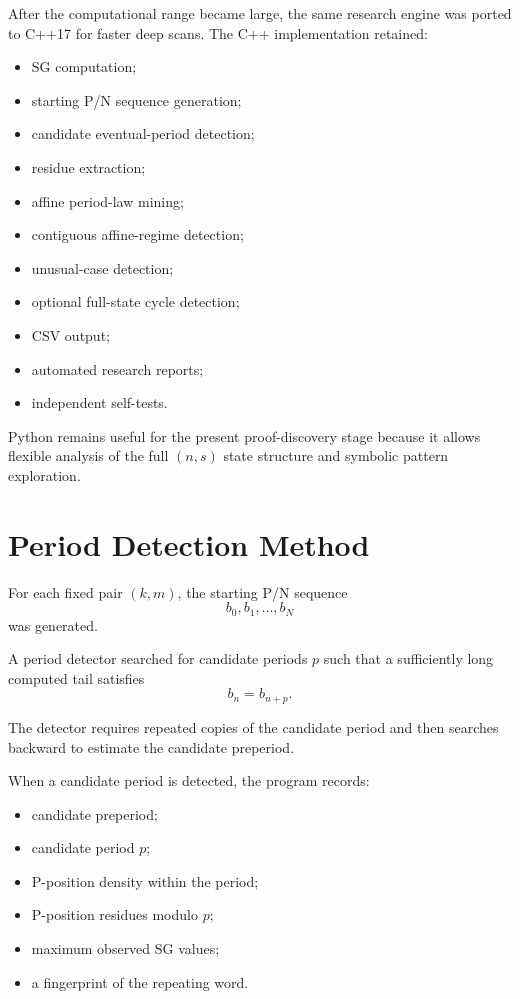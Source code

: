 \documentclass[11pt]{article}
\begin{document}
After the computational range became large, the same research engine was ported to C++17 for faster deep scans. The C++ implementation retained:
\begin{itemize}
    \item SG computation;
    \item starting P/N sequence generation;
    \item candidate eventual-period detection;
    \item residue extraction;
    \item affine period-law mining;
    \item contiguous affine-regime detection;
    \item unusual-case detection;
    \item optional full-state cycle detection;
    \item CSV output;
    \item automated research reports;
    \item independent self-tests.
\end{itemize}

Python remains useful for the present proof-discovery stage because it allows flexible analysis of the full $(n,s)$ state structure and symbolic pattern exploration.

\section{Period Detection Method}

For each fixed pair $(k,m)$, the starting P/N sequence
\begin{equation}
    b_0,b_1,\ldots,b_N
\end{equation}
was generated.

A period detector searched for candidate periods $p$ such that a sufficiently long computed tail satisfies
\begin{equation}
    b_n=b_{n+p}.
\end{equation}

The detector requires repeated copies of the candidate period and then searches backward to estimate the candidate preperiod.

When a candidate period is detected, the program records:
\begin{itemize}
    \item candidate preperiod;
    \item candidate period $p$;
    \item P-position density within the period;
    \item P-position residues modulo $p$;
    \item maximum observed SG values;
    \item a fingerprint of the repeating word.
\end{itemize}
\end{document}
